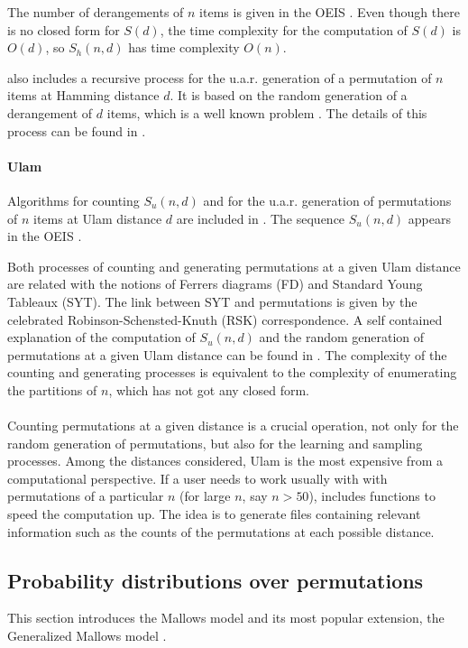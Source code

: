 \documentclass[article,nojss]{jss}
\begin{document}
The number of derangements of $n$ items is given in the OEIS \citep{sloane_hamming}. Even though there is no closed form for $S(d)$, the time complexity for the computation of $S(d)$ is $O(d)$, so $S_h(n,d)$ has time complexity $O(n)$. 

 also includes a recursive process for the u.a.r. generation of a permutation of $n$ items at Hamming distance $d$. It is based on the random generation of a derangement of $d$ items, which is a well known problem \citep{akl02}. The details of this process can be found in \cite{Irurozki2014a}.

\paragraph{Ulam}
Algorithms for counting $S_u(n,d)$ and for the u.a.r. generation of permutations of $n$ items at Ulam distance $d$ are included in . The sequence $S_u(n,d)$ appears in the OEIS \citep{sloane_ulam}.

Both processes of counting and generating permutations at a given Ulam distance are related with the notions of Ferrers diagrams (FD) and Standard Young Tableaux (SYT). The link between SYT and permutations is given by the celebrated  Robinson-Schensted-Knuth (RSK) correspondence. A self contained explanation of the computation of $S_u(n,d)$ and the random generation of permutations at a given Ulam distance can be found in \cite{Irurozki2014}. The complexity of the counting and generating processes is equivalent to the complexity of enumerating the partitions of $n$, which has not got any closed form.

\paragraph{}
Counting permutations at a given distance is a crucial operation, not only for the random generation of permutations, but also for the learning and sampling processes. Among the distances considered, Ulam is the most expensive from a computational perspective. If a user needs to work usually with with permutations of a particular $n$ (for large $n$, say $n>50$),  includes functions to speed the computation up. The idea is to generate files containing relevant information such as the counts of the permutations at each possible distance. 

\subsection{Probability distributions over permutations}%
\label{sec:models}
This section introduces the Mallows model \citep{mallows} and its most popular extension, the Generalized Mallows model \citep{gMallows}. 
\end{document}
